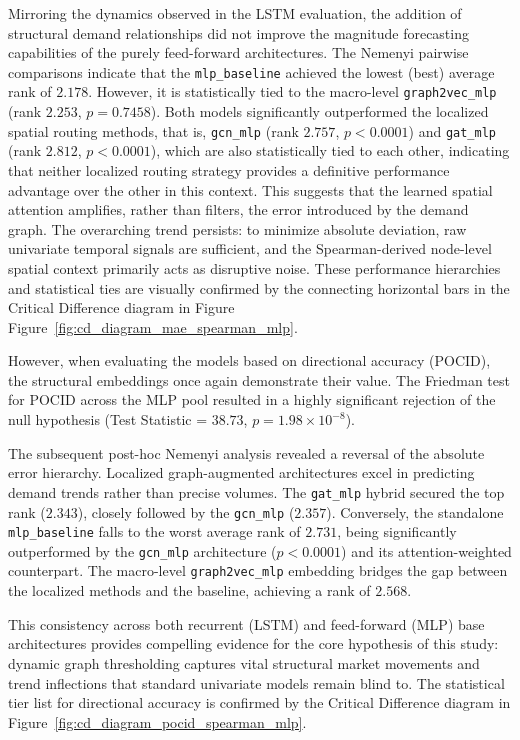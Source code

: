 Mirroring the dynamics observed in the LSTM evaluation, the addition of structural demand relationships did not improve the magnitude forecasting capabilities of the purely feed-forward architectures. The Nemenyi pairwise comparisons indicate that the \texttt{mlp\_baseline} achieved the lowest (best) average rank of $2.178$. However, it is statistically tied to the macro-level \texttt{graph2vec\_mlp} (rank $2.253$, $p = 0.7458$). Both models significantly outperformed the localized spatial routing methods, that is, \texttt{gcn\_mlp} (rank $2.757$, $p < 0.0001$) and \texttt{gat\_mlp} (rank $2.812$, $p < 0.0001$), which are also statistically tied to each other, indicating that neither localized routing strategy provides a definitive performance advantage over the other in this context. This suggests that the learned spatial attention amplifies, rather than filters, the error introduced by the demand graph. The overarching trend persists: to minimize absolute deviation, raw univariate temporal signals are sufficient, and the Spearman-derived node-level spatial context primarily acts as disruptive noise. These performance hierarchies and statistical ties are visually confirmed by the connecting horizontal bars in the Critical Difference diagram in Figure Figure~\ref{fig:cd_diagram_mae_spearman_mlp}.

However, when evaluating the models based on directional accuracy (POCID), the structural embeddings once again demonstrate their value. The Friedman test for POCID across the MLP pool resulted in a highly significant rejection of the null hypothesis (Test Statistic = $38.73$, $p = 1.98 \times 10^{-8}$).

The subsequent post-hoc Nemenyi analysis revealed a reversal of the absolute error hierarchy. Localized graph-augmented architectures excel in predicting demand trends rather than precise volumes. The \texttt{gat\_mlp} hybrid secured the top rank ($2.343$), closely followed by the \texttt{gcn\_mlp} ($2.357$). Conversely, the standalone \texttt{mlp\_baseline} falls to the worst average rank of $2.731$, being significantly outperformed by the \texttt{gcn\_mlp} architecture ($p < 0.0001$) and its attention-weighted counterpart. The macro-level \texttt{graph2vec\_mlp} embedding bridges the gap between the localized methods and the baseline, achieving a rank of $2.568$.

This consistency across both recurrent (LSTM) and feed-forward (MLP) base architectures provides compelling evidence for the core hypothesis of this study: dynamic graph thresholding captures vital structural market movements and trend inflections that standard univariate models remain blind to. The statistical tier list for directional accuracy is confirmed by the Critical Difference diagram in Figure~\ref{fig:cd_diagram_pocid_spearman_mlp}.

